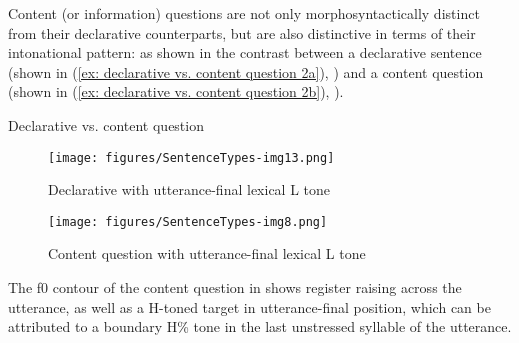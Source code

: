 Content (or information) questions are not only morphosyntactically distinct from their declarative counterparts, but are also distinctive in terms of their intonational pattern: as shown in the contrast between a declarative sentence (shown in (\ref{ex: declarative vs. content question 2a}), ) and a content question (shown in (\ref{ex: declarative vs. content question 2b}), ).

\ea\label{ex: declarative vs. content question 2}
{Declarative vs. content question}

 \label{ex: declarative vs. content question 2a}
        \label{ex: declarative vs. content question 2b}
    \z
\z


\begin{figure}
\texttt{[image: figures/SentenceTypes-img13.png]}
\caption{
\label{fig: declarative with L tone-2 2}
Declarative with utterance-final lexical L tone}
\end{figure}

\begin{figure}
\texttt{[image: figures/SentenceTypes-img8.png]}
\caption{
\label{fig: content question lexical L  tone 2}
Content question with utterance-final lexical L tone}
\end{figure}

The f0 contour of the content question in  shows register raising across the utterance, as well as a H-toned target in utterance-final position, which can be attributed to a boundary H\% tone in the last unstressed syllable of the utterance.

